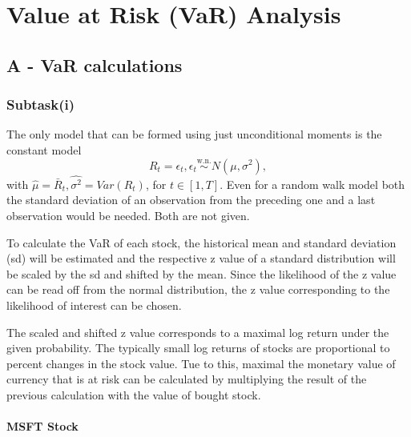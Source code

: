 \section{Value at Risk (VaR) Analysis}
\label{sec:q2_value_at_risk_analysis}
\subsection{A - VaR calculations}

\subsubsection{Subtask(i)}

The only model that can be formed using just unconditional moments is the constant model $$R_t = \epsilon_t, \epsilon_t \overset{\text{w.n.}}{\sim} N(\mu, \sigma^2),$$
with $\hat \mu = \bar R_t, \hat{\sigma^2} = Var(R_t)$, for $t \in [1,T]$. 
Even for a random walk model both the standard deviation of an observation from the preceding one and a last observation would be needed. Both are not given.


To calculate the VaR of each stock, the historical mean and standard deviation (sd) will be estimated and the respective z value of a standard distribution will be scaled by the sd and shifted by the mean. 
Since the likelihood of the z value can be read off from the normal distribution, the z value corresponding to the likelihood of interest can be chosen.


The scaled and shifted z value corresponds to a maximal log return under the given probability. The typically small log returns of stocks are proportional to percent changes in the stock value. Tue to this, maximal the monetary value of currency that is at risk can be calculated by multiplying the result of the previous calculation with the value of bought stock.


\paragraph{MSFT Stock}
